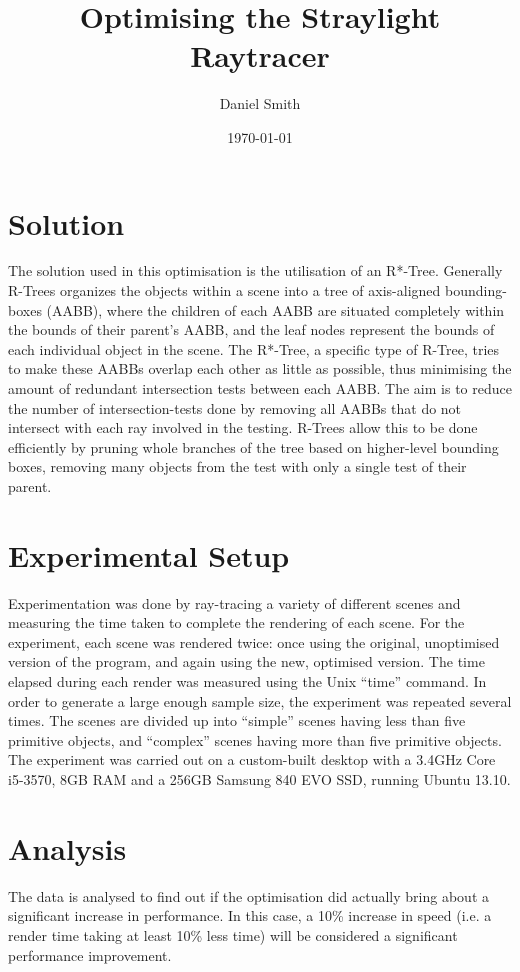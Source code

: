 \documentclass[a4paper]{article}
\title{Optimising the Straylight Raytracer}
\author{Daniel Smith}
\date{\today}
\begin{document}
\maketitle

\section{Solution}
The solution used in this optimisation is the utilisation of an R*-Tree. Generally R-Trees organizes the objects within a scene into a tree of axis-aligned bounding-boxes (AABB), where the children of each AABB are situated completely within the bounds of their parent's AABB, and the leaf nodes represent the bounds of each individual object in the scene. The R*-Tree, a specific type of R-Tree, tries to make these AABBs overlap each other as little as possible, thus minimising the amount of redundant intersection tests between each AABB. The aim is to reduce the number of intersection-tests done by removing all AABBs that do not intersect with each ray involved in the testing. R-Trees allow this to be done efficiently by pruning whole branches of the tree based on higher-level bounding boxes, removing many objects from the test with only a single test of their parent.

\section{Experimental Setup}
Experimentation was done by ray-tracing a variety of different scenes and measuring the time taken to complete the rendering of each scene. For the experiment, each scene was rendered twice: once using the original, unoptimised version of the program, and again using the new, optimised version. The time elapsed during each render was measured using the Unix ``time'' command. In order to generate a large enough sample size, the experiment was repeated several times. The scenes are divided up into ``simple'' scenes having less than five primitive objects, and ``complex'' scenes having more than five primitive objects. The experiment was carried out on a custom-built desktop with a 3.4GHz Core i5-3570, 8GB RAM and a 256GB Samsung 840 EVO SSD, running Ubuntu 13.10.

\section{Analysis}
The data is analysed to find out if the optimisation did actually bring about a significant increase in performance. In this case, a 10\% increase in speed (i.e. a render time taking at least 10\% less time) will be considered a significant performance improvement.
\end{document}
